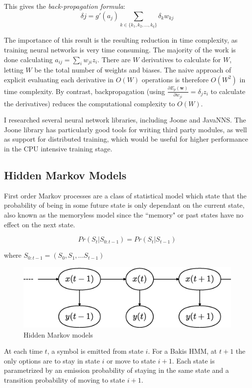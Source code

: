 \documentclass[12pt,a4,notitlepage]{report}
\renewcommand{\_}{\texttt{\symbol{95}}}
\newcommand{\<}{\texttt{\symbol{60}}}
\renewcommand{\>}{\texttt{\symbol{62}}}
\begin{document}
This gives the \textit{back-propagation formula}\cite{NeuralPat}:
\[
\delta j = g'(a_j) \sum_{k \in \{k_1, k_2,\ldots,k_q\}} {\delta_k w_{kj}}
\]

The importance of this result is the resulting reduction in time complexity, as training neural networks is very time consuming. The majority of the work is done calculating $a_{ij} = \sum_i {w_{ji}z_i}$. There are $W$ derivatives to calculate for $W$, letting $W$ be the total number of weights and biases. The naive approach of explicit evaluating each derivative in $O(W)$ operations is therefore $O(W^2)$ in time complexity. By contrast,  backpropagation (using $\frac {\partial E_p(\mathbf w)} {\partial w_{ji}} = \delta_j z_i$ to calculate the derivatives) reduces the computational complexity to $O(W)$.

I researched several neural network libraries, including Joone and JavaNNS. The Joone library has particularly good tools for writing third party modules, as well as support for distributed training, which would be useful for higher performance in the CPU intensive training stage.

\subsection{Hidden Markov Models}

First order Markov processes are a class of statistical model which state that the probability of being in some future state is only dependant on the current state, also known as the memoryless model since the ``memory" or past states have no effect on the next state.

\[ Pr(S_t|S_{0:t-1}) = Pr(S_t|S_{t-1}) \]

where $S_{0:t-1} = (S_0,S_1,...S_{t-1})$

\begin{figure}
\centering
\includegraphics[scale=0.6,angle=0]{diagrams/markov.ps}
\caption{Hidden Markov models}
\label{hmm}
\end{figure}

At each time $t$, a symbol is emitted from state $i$. For a Bakis HMM, at $t+1$ the only options are to stay in state $i$ or move to state $i+1$. Each state is parametrized by an emission probability of staying in the same state and a transition probability of moving to state $i+1$.
\end{document}
